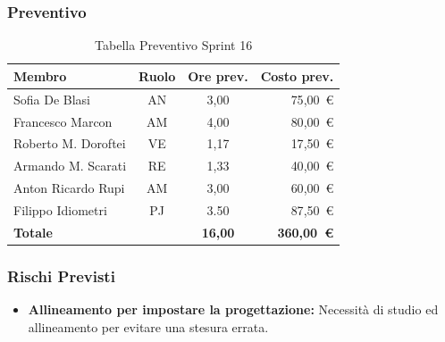 \subsubsection{Preventivo}
\begin{table}[H]
    \centering
    \renewcommand{\arraystretch}{1.3}
    \begin{tabularx}{\textwidth}{|X|c|c|r|}
        \hline
        \textbf{Membro} & \textbf{Ruolo} & \textbf{Ore prev.} & \textbf{Costo prev.} \\
        \hline
        Sofia De Blasi       & AN & 3,00 & 75{,}00~\euro \\
        Francesco Marcon     & AM & 4,00 & 80{,}00~\euro \\
        Roberto M. Doroftei  & VE & 1,17 & 17{,}50~\euro \\
        Armando M. Scarati   & RE & 1,33 & 40{,}00~\euro \\
        Anton Ricardo Rupi   & AM & 3,00 & 60{,}00~\euro \\
        Filippo Idiometri    & PJ & 3.50 & 87{,}50~\euro \\
        \hline
        \textbf{Totale}      &    & \textbf{16,00} & \textbf{360,00~\euro} \\
        \hline
    \end{tabularx}
    \caption{Tabella Preventivo Sprint 16} 
\end{table}

\subsubsection{Rischi Previsti}
\begin{itemize}
    \item \textbf{Allineamento per impostare la progettazione:} Necessità di studio ed allineamento per evitare una stesura errata.
\end{itemize}

